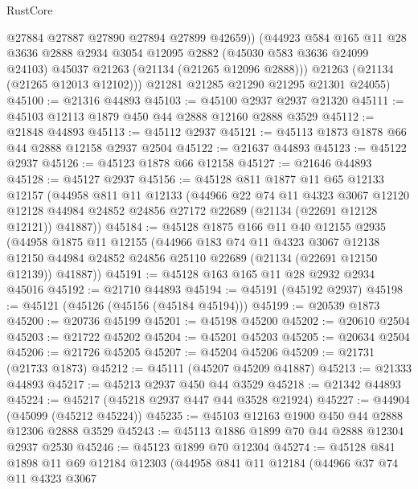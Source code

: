 \begin{lexlean}{RustCore}
\begin{coremodule}
            @27884
            @27887
            @27890
            @27894
            @27899
            @42659))
        (@44923
          @584
          @165
          @11
          @28
          @3636
          @2888
          @2934
          @3054
          @12095
          @2882
          (@45030 @583 @3636 @24099 @24103)
          @45037
          @21263
          (@21134 (@21265 @12096 @2888)))
        @21263
        (@21134 (@21265 @12013 @12102)))
      @21281
      @21285
      @21290
      @21295
      @21301
      @24055)
@45100 := @21316 @44893
@45103 := @45100 @2937 @2937 @21320
@45111 := @45103 @12113 @1879 @450 @44 @2888 @12160 @2888 @3529
@45112 := @21848 @44893
@45113 := @45112 @2937
@45121 := @45113 @1873 @1878 @66 @44 @2888 @12158 @2937 @2504
@45122 := @21637 @44893
@45123 := @45122 @2937
@45126 := @45123 @1878 @66 @12158
@45127 := @21646 @44893
@45128 := @45127 @2937
@45156 := @45128
    @811
    @1877
    @11
    @65
    @12133
    @12157
    (@44958
      @811
      @11
      @12133
      (@44966
        @22
        @74
        @11
        @4323
        @3067
        @12120
        @12128
        @44984
        @24852
        @24856
        @27172
        @22689
        (@21134 (@22691 @12128 @12121))
        @41887))
@45184 := @45128
    @1875
    @166
    @11
    @40
    @12155
    @2935
    (@44958
      @1875
      @11
      @12155
      (@44966
        @183
        @74
        @11
        @4323
        @3067
        @12138
        @12150
        @44984
        @24852
        @24856
        @25110
        @22689
        (@21134 (@22691 @12150 @12139))
        @41887))
@45191 := @45128 @163 @165 @11 @28 @2932 @2934 @45016
@45192 := @21710 @44893
@45194 := @45191 (@45192 @2937)
@45198 := @45121 (@45126 (@45156 (@45184 @45194)))
@45199 := @20539 @1873
@45200 := @20736 @45199
@45201 := @45198 @45200
@45202 := @20610 @2504
@45203 := @21722 @45202
@45204 := @45201 @45203
@45205 := @20634 @2504
@45206 := @21726 @45205
@45207 := @45204 @45206
@45209 := @21731 (@21733 @1873)
@45212 := @45111 (@45207 @45209 @41887)
@45213 := @21333 @44893
@45217 := @45213 @2937 @450 @44 @3529
@45218 := @21342 @44893
@45224 := @45217 (@45218 @2937 @447 @44 @3528 @21924)
@45227 := @44904 (@45099 (@45212 @45224))
@45235 := @45103 @12163 @1900 @450 @44 @2888 @12306 @2888 @3529
@45243 := @45113 @1886 @1899 @70 @44 @2888 @12304 @2937 @2530
@45246 := @45123 @1899 @70 @12304
@45274 := @45128
    @841
    @1898
    @11
    @69
    @12184
    @12303
    (@44958
      @841
      @11
      @12184
      (@44966
        @37
        @74
        @11
        @4323
        @3067

\end{coremodule}
\end{lexlean}
